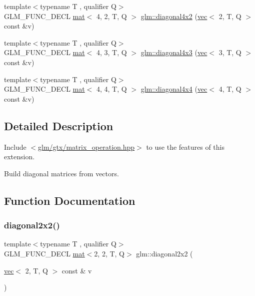 \begin{DoxyCompactItemize}
\item 
{\footnotesize template$<$typename T , qualifier Q$>$ }\\G\+L\+M\+\_\+\+F\+U\+N\+C\+\_\+\+D\+E\+CL \hyperlink{structglm_1_1mat}{mat}$<$ 4, 2, T, Q $>$ \hyperlink{group__gtx__matrix__operation_gacb8969e6543ba775c6638161a37ac330}{glm\+::diagonal4x2} (\hyperlink{structglm_1_1vec}{vec}$<$ 2, T, Q $>$ const \&v)
\item 
{\footnotesize template$<$typename T , qualifier Q$>$ }\\G\+L\+M\+\_\+\+F\+U\+N\+C\+\_\+\+D\+E\+CL \hyperlink{structglm_1_1mat}{mat}$<$ 4, 3, T, Q $>$ \hyperlink{group__gtx__matrix__operation_gae235def5049d6740f0028433f5e13f90}{glm\+::diagonal4x3} (\hyperlink{structglm_1_1vec}{vec}$<$ 3, T, Q $>$ const \&v)
\item 
{\footnotesize template$<$typename T , qualifier Q$>$ }\\G\+L\+M\+\_\+\+F\+U\+N\+C\+\_\+\+D\+E\+CL \hyperlink{structglm_1_1mat}{mat}$<$ 4, 4, T, Q $>$ \hyperlink{group__gtx__matrix__operation_ga0b4cd8dea436791b072356231ee8578f}{glm\+::diagonal4x4} (\hyperlink{structglm_1_1vec}{vec}$<$ 4, T, Q $>$ const \&v)
\end{DoxyCompactItemize}


\subsection{Detailed Description}
Include $<$\hyperlink{matrix__operation_8hpp}{glm/gtx/matrix\+\_\+operation.\+hpp}$>$ to use the features of this extension.

Build diagonal matrices from vectors. 

\subsection{Function Documentation}
\mbox{\label{group__gtx__matrix__operation_ga58a32a2beeb2478dae2a721368cdd4ac}} 
\subsubsection{\texorpdfstring{diagonal2x2()}{diagonal2x2()}}
{\footnotesize\ttfamily template$<$typename T , qualifier Q$>$ \\
G\+L\+M\+\_\+\+F\+U\+N\+C\+\_\+\+D\+E\+CL \hyperlink{structglm_1_1mat}{mat}$<$2, 2, T, Q$>$ glm\+::diagonal2x2 (\begin{DoxyParamCaption}\item[{\hyperlink{structglm_1_1vec}{vec}$<$ 2, T, Q $>$ const \&}]{v }\end{DoxyParamCaption})}



